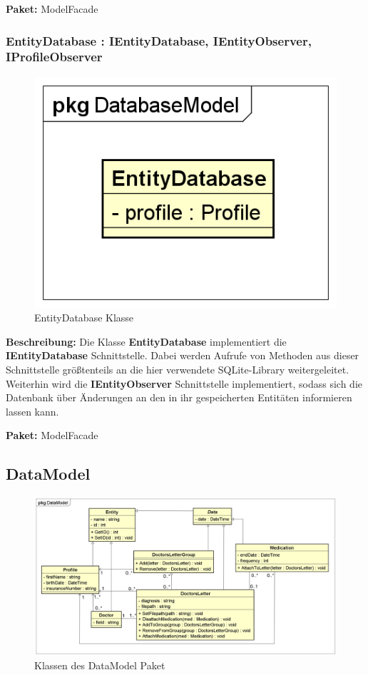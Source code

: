 \documentclass[a4paper]{scrreprt}
\begin{document}
\textbf{Paket:} ModelFacade

\subsubsection{EntityDatabase : IEntityDatabase, IEntityObserver, IProfileObserver}
\begin{figure}[H]
\centering
\includegraphics[width=0.75\textheight]{graphics/Klassendiagramme/Model/EntityDatabase.png}
\caption{EntityDatabase Klasse}
\end{figure}
\textbf{Beschreibung:} Die Klasse \textbf{EntityDatabase} implementiert die \textbf{IEntityDatabase} Schnittstelle. Dabei werden Aufrufe von Methoden aus dieser Schnittstelle größtenteils an die hier verwendete SQLite-Library weitergeleitet.\\
Weiterhin wird die \textbf{IEntityObserver} Schnittstelle implementiert, sodass sich die Datenbank über Änderungen an den in ihr gespeicherten Entitäten informieren lassen kann.

\textbf{Paket:} ModelFacade

\subsection{DataModel}
\begin{figure}[H]
\centering
\includegraphics[width=0.75\textheight]{graphics/Klassendiagramme/Model/DataModelPackage.png}
\caption{Klassen des DataModel Paket}
\end{figure}
\end{document}
